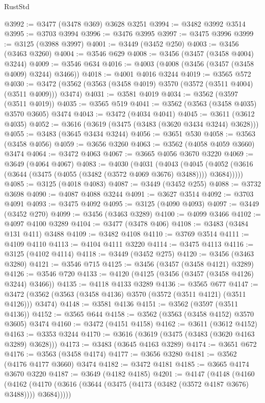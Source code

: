 \begin{lexlean}{RustStd}
\begin{coremodule}
{\begin{coremodule}
{{{{{{{{{{{{{{{{{{{{{{{{{{{{{{{{{{{{{{{{{{{{{@3992 := @3477 (@3478 @369) @3628 @3251
@3994 := @3482 @3992 @3514
@3995 := @3703 @3994
@3996 := @3476 @3995
@3997 := @3475 @3996
@3999 := @3125 (@3988 @3997)
@4001 := @3449 (@3452 @250)
@4003 := @3456 (@3463 @3260)
@4004 := @3546 @629
@4008 := @3456 (@3457 (@3458 @4004) @3244)
@4009 := @3546 @634
@4016 := @4003 (@4008 (@3456 (@3457 (@3458 @4009) @3244) @3466))
@4018 := @4001 @4016 @3244
@4019 := @3565 @572
@4030 := @3472 (@3562 (@3563 (@3458 @4019) @3570 (@3572 (@3511 @4004) (@3511 @4009))) @3474)
@4031 := @3581 @4019
@4034 := @3562 (@3597 (@3511 @4019))
@4035 := @3565 @519
@4041 := @3562 (@3563 (@3458 @4035) @3570 @3605) @3474
@4043 := @3472 (@4034 @4041)
@4045 := @3611 (@3612 @4035)
@4052 := @3616 (@3619 (@3475 (@3483 (@3620 @3434 @3244) @3628)))
@4055 := @3483 (@3645 @3434 @3244)
@4056 := @3651 @530
@4058 := @3563 (@3458 @4056)
@4059 := @3656 @3260
@4063 := @3562 (@4058 @4059 @3660) @3474
@4064 := @3472 @4063
@4067 := @3665 @4056 @3670 @3220
@4069 := @3649 (@4064 @4067)
@4083 := @4030
    (@4031
      (@4043
        (@4045 (@4052 (@3616 (@3644 (@3475 (@4055 (@3482 (@3572 @4069 @3676) @3488)))) @3684)))))
@4085 := @3125 (@4018 @4083)
@4087 := @3449 (@3452 @255)
@4088 := @3732 @3698
@4090 := @4087 @4088 @3244
@4091 := @3627 @3514
@4092 := @3703 @4091
@4093 := @3475 @4092
@4095 := @3125 (@4090 @4093)
@4097 := @3449 (@3452 @270)
@4099 := @3456 (@3463 @3289)
@4100 := @4099 @3466
@4102 := @4097 @4100 @3289
@4104 := @3477 (@3478 @406)
@4108 := @3483 (@3484 @131 @411) @3488
@4109 := @3482 @4108
@4110 := @3769 @3514
@4111 := @4109 @4110
@4113 := @4104 @4111 @3220
@4114 := @3475 @4113
@4116 := @3125 (@4102 @4114)
@4118 := @3449 (@3452 @275)
@4120 := @3456 (@3463 @3280)
@4121 := @3546 @715
@4125 := @3456 (@3457 (@3458 @4121) @3289)
@4126 := @3546 @720
@4133 := @4120 (@4125 (@3456 (@3457 (@3458 @4126) @3244) @3466))
@4135 := @4118 @4133 @3289
@4136 := @3565 @677
@4147 := @3472 (@3562 (@3563 (@3458 @4136) @3570 (@3572 (@3511 @4121) (@3511 @4126))) @3474)
@4148 := @3581 @4136
@4151 := @3562 (@3597 (@3511 @4136))
@4152 := @3565 @644
@4158 := @3562 (@3563 (@3458 @4152) @3570 @3605) @3474
@4160 := @3472 (@4151 @4158)
@4162 := @3611 (@3612 @4152)
@4163 := @3353 @3244
@4170 := @3616 (@3619 (@3475 (@3483 (@3620 @4163 @3289) @3628)))
@4173 := @3483 (@3645 @4163 @3289)
@4174 := @3651 @672
@4176 := @3563 (@3458 @4174)
@4177 := @3656 @3280
@4181 := @3562 (@4176 @4177 @3660) @3474
@4182 := @3472 @4181
@4185 := @3665 @4174 @3670 @3220
@4187 := @3649 (@4182 @4185)
@4201 := @4147
    (@4148
      (@4160
        (@4162 (@4170 (@3616 (@3644 (@3475 (@4173 (@3482 (@3572 @4187 @3676) @3488)))) @3684)))))
}}}}}}}}}}}}}}}}}}}}}}}}}}}}}}}}}}}}}}}}}}}}}
\end{coremodule}}
\end{coremodule}
\end{lexlean}

